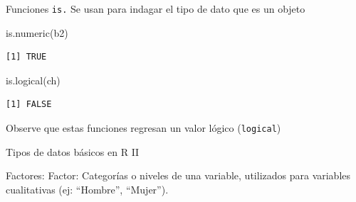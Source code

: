 \documentclass[
  ignorenonframetext,
  aspectratio=169,
  spanish,
]{beamer}
\newenvironment{Shaded}{\begin{snugshade}}{\end{snugshade}}
\newcommand{\FunctionTok}[1]{\textcolor[rgb]{0.28,0.35,0.67}{#1}}
\newcommand{\NormalTok}[1]{\textcolor[rgb]{0.00,0.23,0.31}{#1}}
\begin{document}
\begin{frame}[fragile]{Funciones \texttt{is.}}
\label{funciones-is.}
Se usan para indagar el tipo de dato que es un objeto

\begin{Shaded}
\begin{Highlighting}[]
\FunctionTok{is.numeric}\NormalTok{(b2)}
\end{Highlighting}
\end{Shaded}

\begin{verbatim}
[1] TRUE
\end{verbatim}

\begin{Shaded}
\begin{Highlighting}[]
\FunctionTok{is.logical}\NormalTok{(ch)}
\end{Highlighting}
\end{Shaded}

\begin{verbatim}
[1] FALSE
\end{verbatim}

\begin{tcolorbox}[enhanced jigsaw, leftrule=.75mm, toptitle=1mm, breakable, title=\textcolor{quarto-callout-important-color}{\faExclamation}\hspace{0.5em}{Importante}, colback=white, toprule=.15mm, opacityback=0, arc=.35mm, colframe=quarto-callout-important-color-frame, colbacktitle=quarto-callout-important-color!10!white, bottomtitle=1mm, left=2mm, rightrule=.15mm, opacitybacktitle=0.6, coltitle=black, bottomrule=.15mm, titlerule=0mm]

Observe que estas funciones regresan un valor lógico (\texttt{logical})

\end{tcolorbox}
\end{frame}

\begin{frame}{Tipos de datos básicos en R II}
\label{tipos-de-datos-buxe1sicos-en-r-ii}
\begin{block}{Factores:}
\label{factores}
Factor: Categorías o niveles de una variable, utilizados para variables
cualitativas (ej: ``Hombre'', ``Mujer'').
\end{block}
\end{frame}
\end{document}
